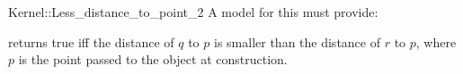 \begin{ccRefFunctionObjectConcept}{Kernel::Less_distance_to_point_2}
A model for this must provide:


{}
 
{returns true iff the distance of $q$ to $p$ is
smaller than the distance of $r$ to $p$, where $p$ is the point
passed to the object at construction.}

\end{ccRefFunctionObjectConcept}
